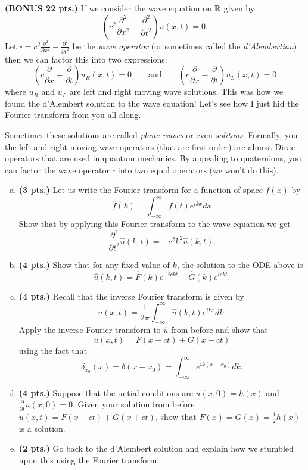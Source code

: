 \documentclass[12pt]{article} %
\begin{document}
\newpage
\begin{problem}
\textbf{(BONUS 22 pts.)} If we consider the wave equation on $\mathbb{R}$ given by
\[
\left( c^2\frac{\partial^2}{\partial x^2} -\frac{\partial^2}{\partial t^2}\right) u(x,t) = 0.
\]
Let $\square = c^2\frac{\partial^2}{\partial x^2} -\frac{\partial^2}{\partial t^2}$ be the \emph{wave operator} (or sometimes called the \emph{d'Alembertian}) then we can factor this into two expressions:
\[
\left( c\frac{\partial}{\partial x} + \frac{\partial}{\partial t} \right) u_R(x,t) =0 \qquad \textrm{and} \qquad \left( c\frac{\partial}{\partial x} - \frac{\partial}{\partial t} \right) u_L(x,t) =0
\]
where $u_R$ and $u_L$ are left and right moving wave solutions. This was how we found the d'Alembert solution to the wave equation! Let's see how I just hid the Fourier transform from you all along.

Sometimes these solutions are called \emph{plane waves} or even \emph{solitons}. Formally, you the left and right moving wave operators (that are first order) are almost Dirac operators that are used in quantum mechanics. By appealing to quaternions, you can factor the wave operator $\square$ into two equal operators (we won't do this).
\begin{enumerate}[(a)]
\item \textbf{(3 pts.)} Let us write the Fourier transform for a function of space $f(x)$ by
\[
\hat{f}(k) = \int_{-\infty}^\infty f(t) e^{i k x} dx
\]
Show that by applying this Fourier transform to the wave equation we get
\[
\frac{\partial^2}{\partial t^2}\hat{u}(k,t) = -c^2 k^2 \hat{u}(k,t).
\]
\item \textbf{(4 pts.)} Show that for any fixed value of $k$, the solution to the ODE above is
\[
\hat{u}(k,t) = \hat{F}(k)e^{-ickt} + \hat{G}(k)e^{ickt}.
\]
\item \textbf{(4 pts.)} Recall that the inverse Fourier transform is given by
\[
u(x,t) = \frac{1}{2\pi} \int_{-\infty}^\infty \hat{u}(k,t) e^{ikx} dk.
\]
Apply the inverse Fourier transform to $\hat{u}$ from before and show that
\[
u(x,t) = F(x-ct) + G(x+ct)
\]
using the fact that
\[
\delta_{x_0}(x) = \delta(x-x_0) = \int_{-\infty}^\infty  e^{ik(x-x_0)} dk.
\]

\item \textbf{(4 pts.)} Suppose that the initial conditions are $u(x,0) = h(x)$ and $\frac{\partial}{\partial t} u(x,0) = 0$. Given your solution from before $u(x,t)=F(x-ct)+G(x+ct)$, show that $F(x)=G(x)=\frac{1}{2}h(x)$ is a solution.

\item \textbf{(2 pts.)} Go back to the d'Alembert solution and explain how we stumbled upon this using the Fourier transform.


\end{enumerate}
\end{problem}
\end{document}
